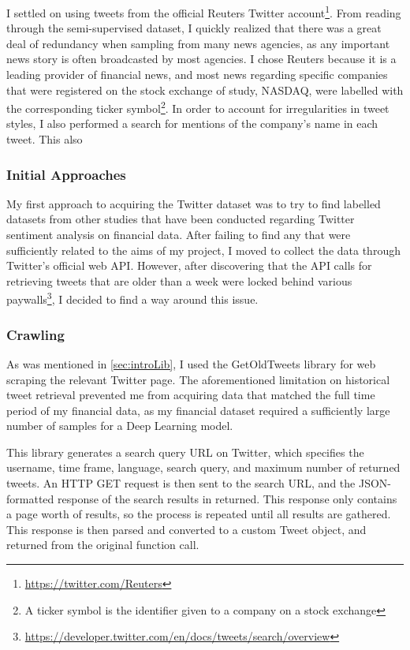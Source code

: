 \documentclass[12pt,a4paper,twoside,openright]{report}
\begin{document}
I settled on using tweets from the official Reuters Twitter account\footnote{\url{https://twitter.com/Reuters}}.
From reading through the semi-supervised dataset, I quickly realized that there was a great deal of redundancy
when sampling from many news agencies, as any important news story is often broadcasted by most agencies.
I chose Reuters because it is a leading provider of financial news, and
most news regarding specific companies that were registered on the stock exchange of
study, NASDAQ, were labelled with the corresponding ticker symbol\footnote{A ticker symbol is the identifier given to a company on
a stock exchange}. In order to account for irregularities in tweet styles,
I also performed a search for mentions of the company's name in each tweet. This also 

\subsubsection{Initial Approaches}
My first approach to acquiring the Twitter dataset was to try to find labelled datasets from other studies
that have been conducted regarding Twitter sentiment analysis on financial data. After failing to find any that 
were sufficiently related to the aims of my project, I moved to collect the data through Twitter's official web API.
However, after discovering that the API calls for retrieving tweets that are older than a week were locked
behind various paywalls\footnote{\url{https://developer.twitter.com/en/docs/tweets/search/overview}}, I decided to find a way around this issue.

\subsubsection{Crawling}
\label{sec:impCrawl}

As was mentioned in \cref{sec:introLib}, I used the GetOldTweets library for web scraping the relevant Twitter page.
The aforementioned limitation on historical tweet retrieval prevented me from acquiring data that matched the 
full time period of my financial data, as my financial dataset required a sufficiently large number of samples 
for a Deep Learning model.

This library generates a search query URL on Twitter, which specifies the username, time frame, language,
search query, and maximum number of returned tweets. An HTTP GET request is then sent to the search URL,
and the JSON-formatted response of the search results in returned. This response only contains a page
worth of results, so the process is repeated until all results are gathered. This response is then parsed and
converted to a custom Tweet object, and returned from the original function call.
\end{document}
